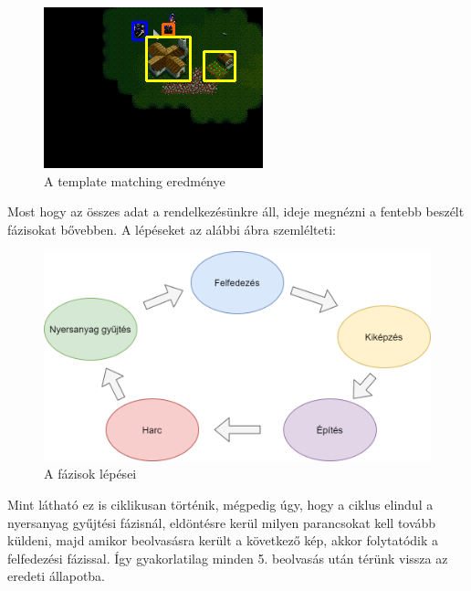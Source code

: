 \begin{figure}[h]
    \centering
    \includegraphics[scale=1]{images/res.png}
    \caption{A template matching eredménye}
    \label{fig:rect}
\end{figure}
\pagebreak
Most hogy az összes adat a rendelkezésünkre áll, ideje megnézni a fentebb beszélt fázisokat bővebben.
A lépéseket az alábbi ábra szemlélteti:
\begin{figure}[h]
    \centering
    \includegraphics[scale=0.4]{images/phases.png}
    \caption{A fázisok lépései}
    \label{fig:phases}
\end{figure}

Mint látható ez is ciklikusan történik, mégpedig úgy, hogy a ciklus elindul a nyersanyag gyűjtési fázisnál, eldöntésre kerül milyen parancsokat kell tovább küldeni, majd amikor beolvasásra került a következő kép, akkor folytatódik a felfedezési fázissal. Így gyakorlatilag minden 5. beolvasás után térünk vissza az eredeti állapotba.

